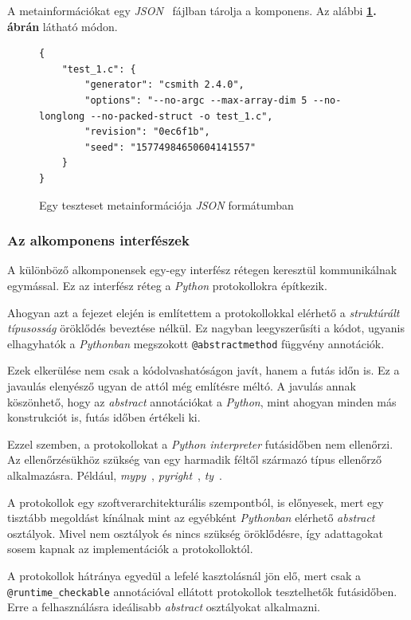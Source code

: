         A metainformációkat egy \textit{JSON}~\cite{json} fájlban tárolja a komponens. Az alábbi
        \textbf{\ref{fig:metadata-json}. ábrán} látható módon.

        \begin{figure}[ht]
            \centering
            \begin{verbatim}
{
    "test_1.c": {
        "generator": "csmith 2.4.0",
        "options": "--no-argc --max-array-dim 5 --no-longlong --no-packed-struct -o test_1.c",
        "revision": "0ec6f1b",
        "seed": "15774984650604141557"
    }
}
        \end{verbatim}
            \caption{\label{fig:metadata-json} Egy teszteset metainformációja \textit{JSON} formátumban}
        \end{figure}

        \pagebreak
        \subsubsection{Az alkomponens interfészek}

            A különböző alkomponensek egy-egy interfész rétegen keresztül kommunikálnak egymással. Ez az interfész
            réteg a \textit{Python} protokollokra építkezik.

            Ahogyan azt a fejezet elején is említettem a protokollokkal elérhető a \textit{struktúrált típusosság}
            öröklődés beveztése nélkül. Ez nagyban leegyszerűsíti a kódot, ugyanis elhagyhatók a \textit{Pythonban}
            megszokott \verb|@abstractmethod| függvény annotációk.

            Ezek elkerülése nem csak a kódolvashatóságon javít, hanem a futás időn is. Ez a javaulás elenyésző ugyan de
            attól még említésre méltó. A javulás annak köszönhető, hogy az \textit{abstract} annotációkat a
            \textit{Python}, mint ahogyan minden más konstrukciót is, futás időben értékeli ki.

            Ezzel szemben, a protokollokat a \textit{Python interpreter} futásidőben nem ellenőrzi. Az ellenőrzésükhöz
            szükség van egy harmadik féltől származó típus ellenőrző alkalmazásra. Például, \textit{mypy}~\cite{mypy},
            \textit{pyright}~\cite{pyright}, \textit{ty}~\cite{ty}.

            A protokollok egy szoftverarchitekturális szempontból, is előnyesek, mert egy tisztább megoldást kínálnak
            mint az egyébként \textit{Pythonban} elérhető \textit{abstract} osztályok. Mivel nem osztályok és nincs
            szükség öröklődésre, így adattagokat sosem kapnak az implementációk a protokolloktól.

            A protokollok hátránya egyedül a lefelé kasztolásnál jön elő, mert csak a \\ \verb|@runtime_checkable|
            annotációval ellátott protokollok tesztelhetők futásidőben. Erre a felhasználásra ideálisabb
            \textit{abstract} osztályokat alkalmazni.
